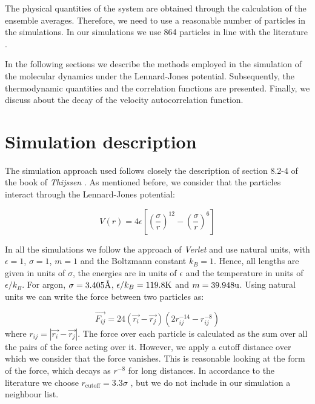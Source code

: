 \documentclass[aps,prl,reprint,groupedaddress]{revtex4-1}
\begin{document}
The physical quantities of the system are obtained through the calculation of the ensemble averages. Therefore, we need to use a reasonable number of particles in the simulations. In our simulations we use 864 particles in line with the literature \cite{Verlet1967, Rahman1964}.

In the following sections we describe the methods employed in the simulation of the molecular dynamics under the Lennard-Jones potential. Subsequently, the thermodynamic quantities and the correlation functions are presented. Finally, we discuss about the decay of the velocity autocorrelation function.

\section{Simulation description \label{description}}

The simulation approach used follows closely the description of section 8.2-4 of the book of \textit{Thijssen} \cite{ICCPBook}. As mentioned before, we consider that the particles interact through the Lennard-Jones potential:

\begin{equation}
	V(r) = 4 \epsilon \left[\left(\frac{\sigma}{r} \right)^{12} - \left(\frac{\sigma}{r} \right)^{6} \right]
\end{equation}

In all the simulations we follow the approach of \textit{Verlet} \cite{Verlet1967} and use natural units, with $\epsilon = 1$, $\sigma = 1$, $m = 1$ and the Boltzmann constant $k_B = 1$. Hence, all lengths are given in units of $\sigma$, the energies are in units of $\epsilon$ and the temperature in units of $\epsilon/k_B$. For argon, $\sigma = 3.405 \textup{\AA}$, $\epsilon/k_B = 119.8 \textup{K}$ \cite{Argon} and $m = 39.948 \textup{u}$. Using natural units we can write the force between two particles as:

\begin{equation}
	\vec{F_{ij}} = 24 \left( \vec{r_i} - \vec{r_j} \right) \left(2r_{ij}^{-14} - r_{ij}^{-8} \right)
\end{equation}
where $r_{ij} = |\vec{r_i} - \vec{r_j}|$. The force over each particle is calculated as the sum over all the pairs of the force acting over it. However, we apply a cutoff distance over which we consider that the force vanishes. This is reasonable looking at the form of the force, which decays as $r^{-8}$ for long distances. In accordance to the literature we choose $r_{\text{cutoff}} = 3.3 \sigma$ \cite{Verlet1967, ICCPBook}, but we do not include in our simulation a neighbour list.
\end{document}
